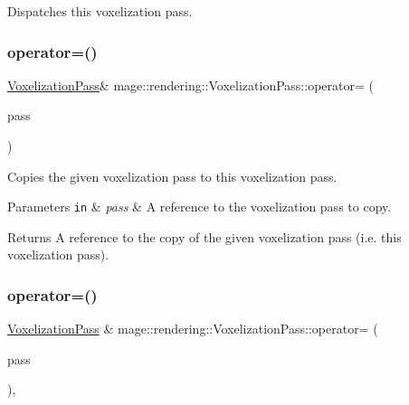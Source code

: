 Dispatches this voxelization pass. \hypertarget{classmage_1_1rendering_1_1_voxelization_pass_a30bf15dac8660764cd1342a4f397e47e}{}\label{classmage_1_1rendering_1_1_voxelization_pass_a30bf15dac8660764cd1342a4f397e47e} 
\subsubsection{\texorpdfstring{operator=()}{operator=()}\hspace{0.1cm}{\footnotesize\ttfamily [1/2]}}
{\footnotesize\ttfamily \hyperlink{classmage_1_1rendering_1_1_voxelization_pass}{Voxelization\+Pass}\& mage\+::rendering\+::\+Voxelization\+Pass\+::operator= (\begin{DoxyParamCaption}\item[{const \hyperlink{classmage_1_1rendering_1_1_voxelization_pass}{Voxelization\+Pass} \&}]{pass }\end{DoxyParamCaption})\hspace{0.3cm}{\ttfamily [delete]}}

Copies the given voxelization pass to this voxelization pass.


\begin{DoxyParams}[1]{Parameters}
\mbox{\tt in}  & {\em pass} & A reference to the voxelization pass to copy. \\
\hline
\end{DoxyParams}
\begin{DoxyReturn}{Returns}
A reference to the copy of the given voxelization pass (i.\+e. this voxelization pass). 
\end{DoxyReturn}
\hypertarget{classmage_1_1rendering_1_1_voxelization_pass_ac7beb95fbf6fd85355703854ac282e91}{}\label{classmage_1_1rendering_1_1_voxelization_pass_ac7beb95fbf6fd85355703854ac282e91} 
\subsubsection{\texorpdfstring{operator=()}{operator=()}\hspace{0.1cm}{\footnotesize\ttfamily [2/2]}}
{\footnotesize\ttfamily \hyperlink{classmage_1_1rendering_1_1_voxelization_pass}{Voxelization\+Pass} \& mage\+::rendering\+::\+Voxelization\+Pass\+::operator= (\begin{DoxyParamCaption}\item[{\hyperlink{classmage_1_1rendering_1_1_voxelization_pass}{Voxelization\+Pass} \&\&}]{pass }\end{DoxyParamCaption})\hspace{0.3cm}{\ttfamily [default]}, {\ttfamily [noexcept]}}

